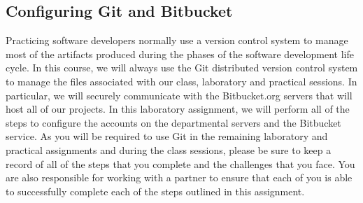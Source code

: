 \subsection*{Configuring Git and Bitbucket}
\vspace*{-.1in}
Practicing software developers normally use a version control system to manage most of the artifacts produced during the phases of the software development life cycle.  In this course, we will always use the Git distributed version control system to manage the files associated with our class, laboratory and practical sessions.  In particular, we will securely communicate with the Bitbucket.org servers that will host all of our projects.  In this laboratory assignment, we will perform all of the steps to configure the accounts on the departmental servers and the Bitbucket service.  As you will be required to use Git in the remaining laboratory and practical assignments and during the class sessions, please be sure to keep a record of all of the steps that you complete and the challenges that you face.  You are also
responsible for working with a partner to ensure that each of you is able to successfully complete each of the steps outlined in this assignment.

